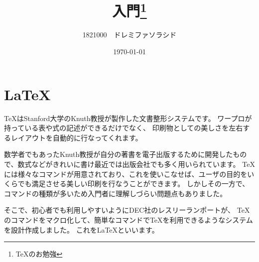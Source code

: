 \documentclass[12pt,a4j]{jarticle}
\title{\LaTeXe 入門{\thanks{\TeX{}のお勉強}} }
\author{1821000　ドレミファソラシド}
\date{\today}
\begin{document}
\maketitle

\part{LaTeX}
TeXはStanford大学のKnuth教授が製作した文書整形システムです。
ワープロが持っている表や式の記述ができるだけでなく、
印刷物としての美しさを左右するレイアウトを自動的に行なってくれます。

数学者でもあったKnuth教授が自分の著書を電子出版するために開発したもので、数式などがきれいに書け最近では出版会社でも多く用いられています。
TeXには様々なコマンドが用意されており、これを使いこなせば、ユーザの目的をいくらでも満足させる美しい印刷を行なうことができます。
しかしその一方で、コマンドの種類が多いため入門者に理解しづらい問題点もありました。

そこで、初心者でも利用しやすいようにDEC社のレスリーランポートが、
TeXのコマンドをマクロ化して、簡単なコマンドでTeXを利用できるようなシステムを設計作成しました。
これをLaTeXといいます。
\end{document}
